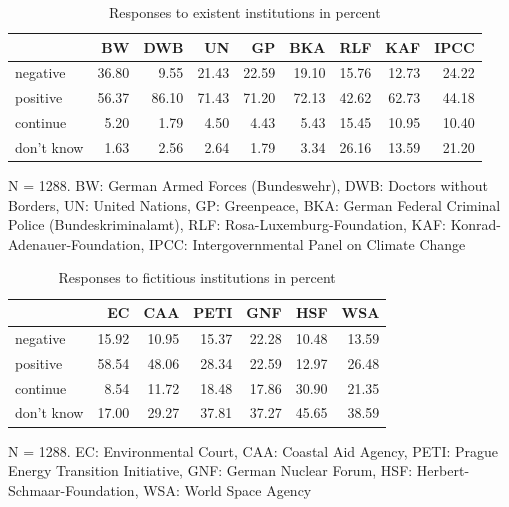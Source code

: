 \documentclass[Royal,times,sageh]{sagej}
\begin{document}
\begin{table}

\begin{threeparttable}
\caption{\label{tab:unnamed-chunk-3}\label{tab:freqs}Responses to existent institutions in percent}
\centering
\begin{tabular}[t]{lrrrrrrrr}
\toprule
  & BW & DWB & UN & GP & BKA & RLF & KAF & IPCC\\
\midrule
negative & 36.80 & 9.55 & 21.43 & 22.59 & 19.10 & 15.76 & 12.73 & 24.22\\
positive & 56.37 & 86.10 & 71.43 & 71.20 & 72.13 & 42.62 & 62.73 & 44.18\\
continue & 5.20 & 1.79 & 4.50 & 4.43 & 5.43 & 15.45 & 10.95 & 10.40\\
don't know & 1.63 & 2.56 & 2.64 & 1.79 & 3.34 & 26.16 & 13.59 & 21.20\\
\bottomrule
\end{tabular}
\begin{tablenotes}
\small
\item [] N = 1288. BW: German Armed Forces (Bundeswehr), DWB: Doctors without Borders, UN: United Nations, GP: Greenpeace, BKA: German Federal Criminal Police (Bundeskriminalamt), RLF: Rosa-Luxemburg-Foundation, KAF: Konrad-Adenauer-Foundation, IPCC: Intergovernmental Panel on Climate Change
\end{tablenotes}
\end{threeparttable}
\end{table}

\begin{table}

\begin{threeparttable}
\caption{\label{tab:unnamed-chunk-3}\label{tab:freqs_fi}Responses to fictitious institutions in percent}
\centering
\begin{tabular}[t]{lrrrrrr}
\toprule
  & EC & CAA & PETI & GNF & HSF & WSA\\
\midrule
negative & 15.92 & 10.95 & 15.37 & 22.28 & 10.48 & 13.59\\
positive & 58.54 & 48.06 & 28.34 & 22.59 & 12.97 & 26.48\\
continue & 8.54 & 11.72 & 18.48 & 17.86 & 30.90 & 21.35\\
don't know & 17.00 & 29.27 & 37.81 & 37.27 & 45.65 & 38.59\\
\bottomrule
\end{tabular}
\begin{tablenotes}
\small
\item [] N = 1288. EC: Environmental Court, CAA: Coastal Aid Agency, PETI: Prague Energy Transition Initiative, GNF: German Nuclear Forum, HSF: Herbert-Schmaar-Foundation, WSA: World Space Agency
\end{tablenotes}
\end{threeparttable}
\end{table}
\end{document}
